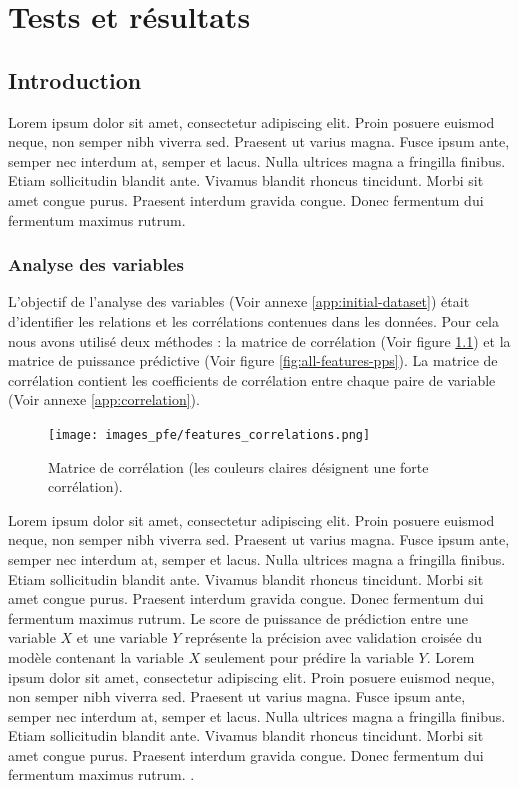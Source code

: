 \chapter{Tests et résultats}
\clearpage
\section{Introduction}
Lorem ipsum dolor sit amet, consectetur adipiscing elit. Proin posuere euismod neque, non semper nibh viverra sed. Praesent ut varius magna. Fusce ipsum ante, semper nec interdum at, semper et lacus. Nulla ultrices magna a fringilla finibus. Etiam sollicitudin blandit ante. Vivamus blandit rhoncus tincidunt. Morbi sit amet congue purus. Praesent interdum gravida congue. Donec fermentum dui fermentum maximus rutrum.

\subsection{Analyse des variables}
L'objectif de l'analyse des variables (Voir annexe \ref{app:initial-dataset}) était d'identifier les relations et les corrélations contenues dans les données. Pour cela nous avons utilisé deux méthodes : la matrice de corrélation (Voir figure \ref{fig:all-features-correlations}) et la matrice de puissance prédictive (Voir figure \ref{fig:all-features-pps}). La matrice de corrélation contient les coefficients de corrélation entre chaque paire de variable (Voir annexe \ref{app:correlation}).

\begin{figure}[hbt!]
  \centering
  \texttt{[image: images\_pfe/features\_correlations.png]}
  \caption{Matrice de corrélation (les couleurs claires désignent une forte corrélation).}
  \label{fig:all-features-correlations}
\end{figure}
\FloatBarrier

Lorem ipsum dolor sit amet, consectetur adipiscing elit. Proin posuere euismod neque, non semper nibh viverra sed. Praesent ut varius magna. Fusce ipsum ante, semper nec interdum at, semper et lacus. Nulla ultrices magna a fringilla finibus. Etiam sollicitudin blandit ante. Vivamus blandit rhoncus tincidunt. Morbi sit amet congue purus. Praesent interdum gravida congue. Donec fermentum dui fermentum maximus rutrum. Le score de puissance de prédiction entre une variable $X$ et une variable $Y$ représente la précision avec validation croisée du modèle contenant la variable $X$ seulement pour prédire la variable $Y$. Lorem ipsum dolor sit amet, consectetur adipiscing elit. Proin posuere euismod neque, non semper nibh viverra sed. Praesent ut varius magna. Fusce ipsum ante, semper nec interdum at, semper et lacus. Nulla ultrices magna a fringilla finibus. Etiam sollicitudin blandit ante. Vivamus blandit rhoncus tincidunt. Morbi sit amet congue purus. Praesent interdum gravida congue. Donec fermentum dui fermentum maximus rutrum. \parencite{wetschoreck_rip_2020}.

